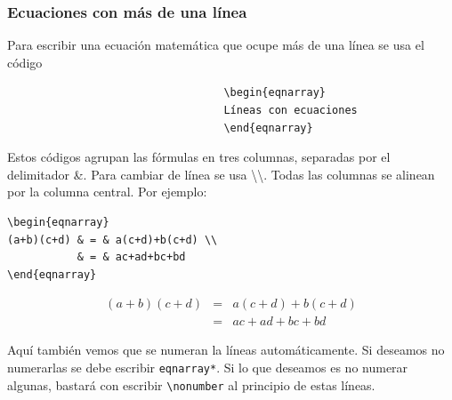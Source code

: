 \documentclass[10pt,a4paper]{article}
\begin{document}
\bigskip

\subsubsection{Ecuaciones con más de una línea}%

Para escribir una ecuación matemática que ocupe más de una línea se usa el código 

\begin{verbatim}
                                  \begin{eqnarray}
                                  Líneas con ecuaciones
                                  \end{eqnarray}
\end{verbatim}

\noindent Estos códigos agrupan las fórmulas en tres columnas, separadas por el delimitador \&. Para cambiar de línea se usa \textbackslash\textbackslash. Todas las columnas se alinean por la columna central. Por ejemplo:


\begin{table}[ht!]
\begin{minipage}{0.5\textwidth}
\begin{verbatim}
\begin{eqnarray}
(a+b)(c+d) & = & a(c+d)+b(c+d) \\ 
           & = & ac+ad+bc+bd    
\end{eqnarray}
\end{verbatim}
\end{minipage}
%
\begin{minipage}{0.5\textwidth}
\begin{eqnarray}
(a+b)(c+d) & = & a(c+d)+b(c+d) \\ 
           & = & ac+ad+bc+bd    
\end{eqnarray}
\caption[Comando \texttt{eqnarray}]{Entorno \texttt{eqnarray}}
%
\end{minipage}
\end{table}

\bigskip

Aquí también vemos que se numeran la líneas automáticamente. Si deseamos no numerarlas se debe escribir \texttt{eqnarray*}. Si lo que deseamos es no numerar algunas, bastará con escribir \verb/\nonumber/ al principio de estas líneas.
\end{document}
